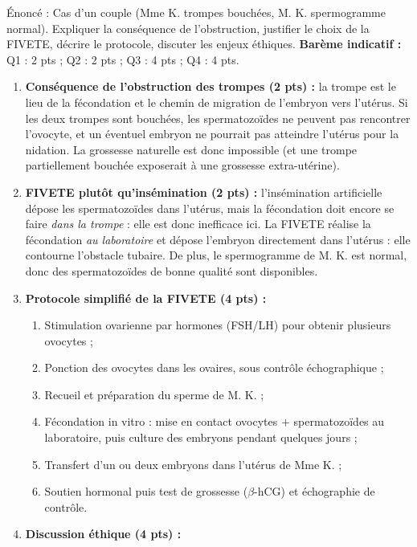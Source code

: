 \documentclass[11pt]{article}
\begin{document}
\begin{corrige}
Énoncé : Cas d'un couple (Mme K. trompes bouchées, M. K. spermogramme normal). Expliquer la conséquence de l'obstruction, justifier le choix de la FIVETE, décrire le protocole, discuter les enjeux éthiques.
\tcblower
\textbf{Barème indicatif :} Q1 : 2 pts ; Q2 : 2 pts ; Q3 : 4 pts ; Q4 : 4 pts.
\begin{enumerate}
\item \textbf{Conséquence de l'obstruction des trompes (2 pts) :} la trompe est le lieu de la fécondation et le chemin de migration de l'embryon vers l'utérus. Si les deux trompes sont bouchées, les spermatozoïdes ne peuvent pas rencontrer l'ovocyte, et un éventuel embryon ne pourrait pas atteindre l'utérus pour la nidation. La grossesse naturelle est donc impossible (et une trompe partiellement bouchée exposerait à une grossesse extra-utérine).
\item \textbf{FIVETE plutôt qu'insémination (2 pts) :} l'insémination artificielle dépose les spermatozoïdes dans l'utérus, mais la fécondation doit encore se faire \emph{dans la trompe} : elle est donc inefficace ici. La FIVETE réalise la fécondation \emph{au laboratoire} et dépose l'embryon directement dans l'utérus : elle contourne l'obstacle tubaire. De plus, le spermogramme de M. K. est normal, donc des spermatozoïdes de bonne qualité sont disponibles.
\item \textbf{Protocole simplifié de la FIVETE (4 pts) :}
\begin{enumerate}
\item Stimulation ovarienne par hormones (FSH/LH) pour obtenir plusieurs ovocytes ;
\item Ponction des ovocytes dans les ovaires, sous contrôle échographique ;
\item Recueil et préparation du sperme de M. K. ;
\item Fécondation in vitro : mise en contact ovocytes + spermatozoïdes au laboratoire, puis culture des embryons pendant quelques jours ;
\item Transfert d'un ou deux embryons dans l'utérus de Mme K. ;
\item Soutien hormonal puis test de grossesse ($\beta$-hCG) et échographie de contrôle.
\end{enumerate}
\item \textbf{Discussion éthique (4 pts) :}


\end{enumerate}
\end{corrige}
\end{document}
